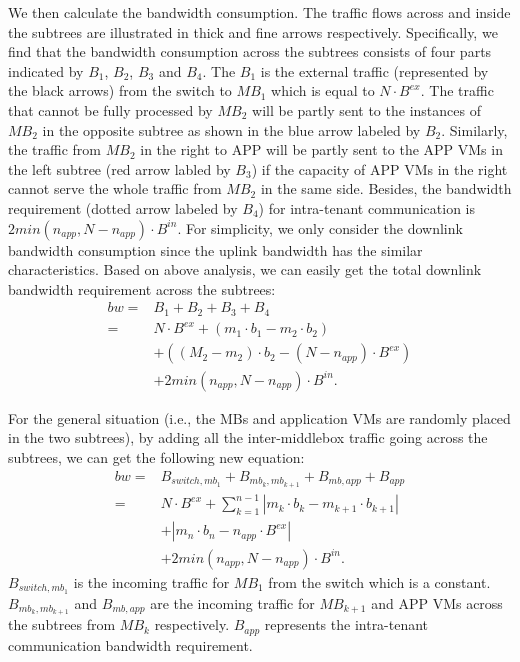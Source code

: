 \documentclass[review]{elsarticle}
\begin{document}
We then calculate the bandwidth consumption. The traffic flows across and inside the subtrees are illustrated in thick and fine arrows respectively. Specifically, we find that the bandwidth consumption across the subtrees consists of four parts indicated by $B_1$, $B_2$, $B_3$ and $B_4$. The $B_1$ is the external traffic (represented by the black arrows) from the switch to $MB_1$ which is equal to $N\cdot B^{ex}$. The traffic that cannot be fully processed by $MB_2$ will be partly sent to the instances of $MB_2$ in the opposite subtree as shown in the blue arrow labeled by $B_2$. Similarly, the traffic from $MB_2$ in the right to APP will be partly sent to the APP VMs in the left subtree (red arrow labled by $B_3$) if the capacity of APP VMs in the right cannot serve the whole traffic from $MB_2$ in the same side. Besides, the bandwidth requirement (dotted arrow labeled by $B_4$) for intra-tenant communication is $2min⁡(n_{app}  ,N-n_{app})\cdot B^{in}$. For simplicity, we only consider the downlink bandwidth consumption since the uplink bandwidth has the similar characteristics. Based on above analysis, we can easily get the total downlink bandwidth requirement across the subtrees:
\begin{equation}
\begin{aligned}
bw = &B_1+B_2+B_3+B_4 \\
=&N \cdot B^{ex}+(m_1 \cdot b_1-m_2\cdot b_2)\\
&+((M_2-m_2)\cdot b_2-(N-n_{app})\cdot B^{ex})\\
&+2min(n_{app}, N-n_{app})\cdot B^{in}.
\end{aligned}
\end{equation}

For the general situation (i.e., the MBs and application VMs are randomly placed in the two subtrees), by adding all the inter-middlebox traffic going across the subtrees, we can get the following new equation:
\begin{equation}
\begin{aligned}
bw= &B_{switch,mb_{1}}+B_{mb_k,mb_{k+1}}+B_{mb,app}+B_{app}\\
 =&N\cdot B^{ex}+\sum\limits_{k=1}^{n-1}|m_k\cdot b_k-m_{k+1}\cdot b_{k+1}|\\
&+|m_n\cdot b_n-n_{app}\cdot B^{ex}|
\\&+2min(n_{app}, N-n_{app})\cdot B^{in}.
\end{aligned}
\label{equ:bw_equation}
\end{equation}
%
$B_{switch,mb_1}$ is the incoming traffic for $MB_1$ from the switch which is a constant. $B_{mb_k,mb_{k+1}}$ and $B_{mb,app}$ are the incoming traffic for $MB_{k+1}$ and APP VMs across the subtrees from $MB_k$ respectively. $B_{app}$ represents the intra-tenant communication bandwidth requirement.
\end{document}
